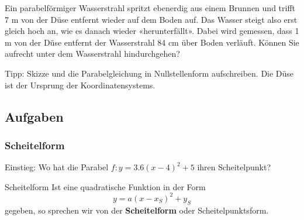 Ein parabelförmiger Wasserstrahl spritzt ebenerdig aus einem Brunnen
und trifft 7 m von der Düse entfernt wieder auf dem Boden auf.
Das Wasser steigt also erst gleich hoch an, wie es danach wieder «herunterfällt».
Dabei wird gemessen, dass 1 m von der Düse entfernt der Wasserstrahl 84
cm über Boden verläuft.
Können Sie aufrecht unter dem Wasserstrahl hindurchgehen?

Tipp: Skizze und  die Parabelgleichung in Nullstellenform aufschreiben. Die Düse ist der Ursprung der Koordinatensystems.\\



\subsection*{Aufgaben}%

\newpage

\subsubsection{Scheitelform}
Einstieg: Wo hat die Parabel $f: y=3.6(x-4)^2 + 5$ ihren
Scheitelpunkt?


\begin{gesetz}{Scheitelform}{}
  Ist eine quadratische Funktion in der Form
$$y = a(x-x_S)^2 + y_S$$
gegeben, so sprechen wir von der \textbf{Scheitelform} oder Scheitelpunktsform.
\end{gesetz}

